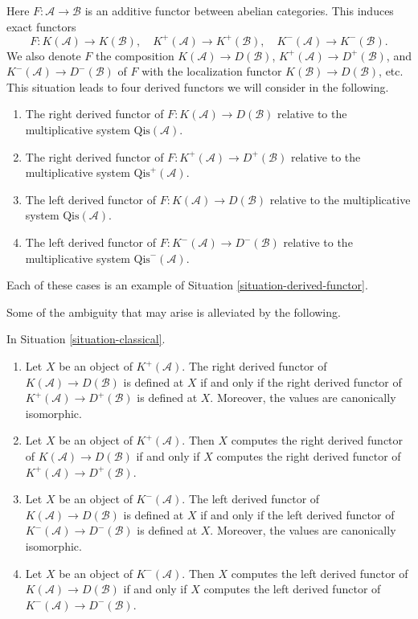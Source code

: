 \begin{situation}
\label{situation-classical}
Here $F : \mathcal{A} \to \mathcal{B}$ is an additive functor between
abelian categories. This induces exact functors
$$
F : K(\mathcal{A}) \to K(\mathcal{B}), \quad
K^{+}(\mathcal{A}) \to K^{+}(\mathcal{B}), \quad
K^{-}(\mathcal{A}) \to K^{-}(\mathcal{B}).
$$
We also denote $F$ the composition $K(\mathcal{A}) \to D(\mathcal{B})$,
$K^{+}(\mathcal{A}) \to D^{+}(\mathcal{B})$, and
$K^{-}(\mathcal{A}) \to D^-(\mathcal{B})$ of $F$ with the localization
functor $K(\mathcal{B}) \to D(\mathcal{B})$, etc. This situation leads
to four derived functors we will consider in the following.
\begin{enumerate}
\item The right derived functor of
$F : K(\mathcal{A}) \to D(\mathcal{B})$
relative to the multiplicative system $\text{Qis}(\mathcal{A})$.
\item The right derived functor of
$F : K^{+}(\mathcal{A}) \to D^{+}(\mathcal{B})$
relative to the multiplicative system $\text{Qis}^{+}(\mathcal{A})$.
\item The left derived functor of
$F : K(\mathcal{A}) \to D(\mathcal{B})$
relative to the multiplicative system $\text{Qis}(\mathcal{A})$.
\item The left derived functor of
$F : K^{-}(\mathcal{A}) \to D^{-}(\mathcal{B})$
relative to the multiplicative system $\text{Qis}^-(\mathcal{A})$.
\end{enumerate}
Each of these cases is an example of
Situation \ref{situation-derived-functor}.
\end{situation}

\noindent
Some of the ambiguity that may arise is alleviated by the following.

\begin{lemma}
\label{lemma-irrelevant}
In
Situation \ref{situation-classical}.
\begin{enumerate}
\item Let $X$ be an object of $K^{+}(\mathcal{A})$.
The right derived functor of $K(\mathcal{A}) \to D(\mathcal{B})$
is defined at $X$ if and only if the right derived functor of
$K^{+}(\mathcal{A}) \to D^{+}(\mathcal{B})$ is defined at $X$.
Moreover, the values are canonically isomorphic.
\item Let $X$ be an object of $K^{+}(\mathcal{A})$.
Then $X$ computes the right derived functor of
$K(\mathcal{A}) \to D(\mathcal{B})$
if and only if $X$ computes the right derived functor of
$K^{+}(\mathcal{A}) \to D^{+}(\mathcal{B})$.
\item Let $X$ be an object of $K^{-}(\mathcal{A})$.
The left derived functor of $K(\mathcal{A}) \to D(\mathcal{B})$
is defined at $X$ if and only if the left derived functor of
$K^{-}(\mathcal{A}) \to D^{-}(\mathcal{B})$ is defined at $X$.
Moreover, the values are canonically isomorphic.
\item Let $X$ be an object of $K^{-}(\mathcal{A})$.
Then $X$ computes the left derived functor of
$K(\mathcal{A}) \to D(\mathcal{B})$ if and only if $X$ computes
the left derived functor of $K^{-}(\mathcal{A}) \to D^{-}(\mathcal{B})$.
\end{enumerate}
\end{lemma}

